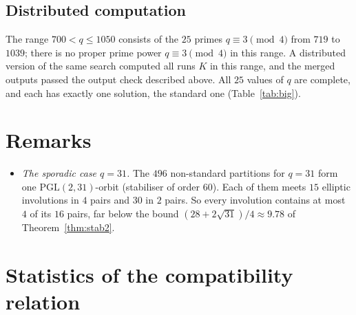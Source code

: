 \documentclass[11pt,a4paper]{article}
\theoremstyle{definition}
\theoremstyle{remark}
\newcommand{\PGL}{\mathrm{PGL}}
\begin{document}
\subsection{Distributed computation}\label{sec:dist}

The range $700<q\le1050$ consists of the $25$ primes $q\equiv3\pmod4$ from $719$ to $1039$; there is no proper
prime power $q\equiv3\pmod4$ in this range. A distributed version of the same search computed all runs $K$ in
this range, and the merged outputs passed the output check described above. All $25$ values of $q$ are complete,
and each has exactly one solution, the standard one (Table~\ref{tab:big}).

\section{Remarks}

\begin{itemize}
\item \emph{The sporadic case $q=31$.} The $496$ non-standard partitions for $q=31$ form one $\PGL(2,31)$-orbit
(stabiliser of order $60$). Each of them meets $15$ elliptic
involutions in $4$ pairs and $30$ in $2$ pairs. So every involution contains at most $4$ of its $16$ pairs, far
below the bound $(28+2\sqrt{31})/4\approx9.78$ of Theorem~\ref{thm:stab2}.
\end{itemize}

\section{Statistics of the compatibility relation}\label{sec:stats}
\end{document}
